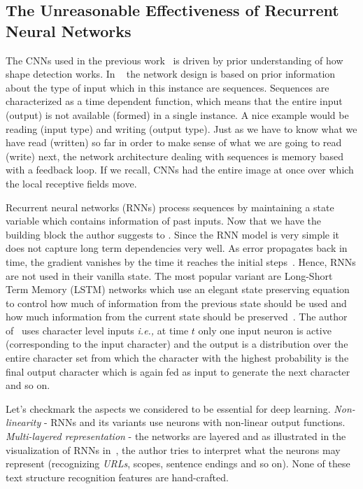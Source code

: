 \documentclass[10pt]{article}
\begin{document}
\subsection{The Unreasonable Effectiveness of Recurrent Neural Networks}
\par The CNNs used in the previous work~\cite{krizhevsky2012imagenet} is driven by prior understanding of how shape detection works. In ~\cite{karpathy2016unreasonable} the network design is based on prior information about the type of input which in this instance are sequences. Sequences are characterized as a time dependent function, which means that the entire input (output) is not available (formed) in a single instance. A nice example would be reading (input type) and writing (output type). Just as we have to know what we have read (written) so far in order to make sense of what we are going to read (write) next, the network architecture dealing with sequences is memory based with a feedback loop. If we recall, CNNs had the entire image at once over which the local receptive fields move.
\par Recurrent neural networks (RNNs) process sequences by maintaining a state variable which contains information of past inputs. Now that we have the building block the author suggests to . Since the RNN model is very simple it does not capture long term dependencies very well. As error propagates back in time, the gradient vanishes by the time it reaches the initial steps~\cite{britz2015recurrent}. Hence, RNNs are not used in their vanilla state. The most popular variant are Long-Short Term Memory (LSTM) networks which use an elegant state preserving equation to control how much of information from the previous state should be used and how much information from the current state should be preserved~\cite{olah2015understanding}. The author of~\cite{karpathy2016unreasonable} uses character level inputs \emph{i.e.,} at time $t$ only one input neuron is active (corresponding to the input character) and the output is a distribution over the entire character set from which the character with the highest probability is the final output character which is again fed as input to generate the next character and so on. 
\par Let's checkmark the aspects we considered to be essential for deep learning. \textit{Non-linearity} - RNNs and its variants use neurons with non-linear output functions. \textit{Multi-layered representation} - the networks are layered and as illustrated in the visualization of RNNs in~\cite{karpathy2016unreasonable}, the author tries to interpret what the neurons may represent (recognizing \textit{URLs}, scopes, sentence endings and so on). None of these text structure recognition features are hand-crafted.
\end{document}
